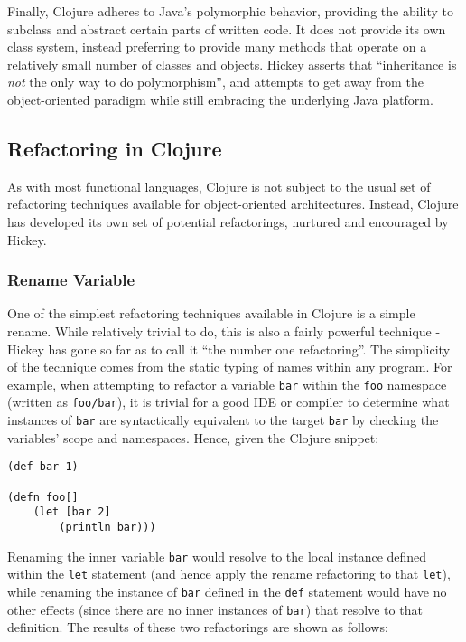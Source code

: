 \documentclass{article}
\begin{document}
Finally, Clojure adheres to Java's polymorphic behavior, providing the ability to subclass and abstract certain parts of written code. It does not provide its own class system, instead preferring to provide many methods that operate on a relatively small number of classes and objects. Hickey asserts that ``inheritance is \textit{not} the only way to do polymorphism''\cite{1}, and attempts to get away from the object-oriented paradigm while still embracing the underlying Java platform.

\subsection{Refactoring in Clojure}

As with most functional languages, Clojure is not subject to the usual set of refactoring techniques available for object-oriented architectures. Instead, Clojure has developed its own set of potential refactorings, nurtured and encouraged by Hickey.

\subsubsection{Rename Variable}

One of the simplest refactoring techniques available in Clojure is a simple rename. While relatively trivial to do, this is also a fairly powerful technique - Hickey has gone so far as to call it ``the number one refactoring''\cite{2}. The simplicity of the technique comes from the static typing of names within any program. For example, when attempting to refactor a variable \verb!bar! within the \verb!foo! namespace (written as \verb!foo/bar!), it is trivial for a good IDE or compiler to determine what instances of \verb!bar! are syntactically equivalent to the target \verb!bar! by checking the variables' scope and namespaces. Hence, given the Clojure snippet:

\begin{verbatim}
(def bar 1)

(defn foo[]
    (let [bar 2]
        (println bar)))
\end{verbatim}

Renaming the inner variable \verb!bar! would resolve to the local instance defined within the \verb!let! statement (and hence apply the rename refactoring to that \verb!let!), while renaming the instance of \verb!bar! defined in the \verb!def! statement would have no other effects (since there are no inner instances of \verb!bar!) that resolve to that definition. The results of these two refactorings are shown as follows:
\end{document}
